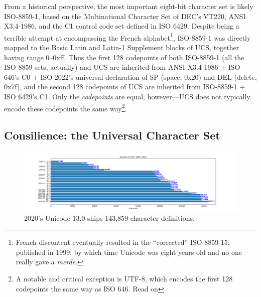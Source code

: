 From a historical perspective, the most important eight-bit character set
is likely ISO-8859-1\cite{iso8859}, based on the Multinational Character Set
of DEC's VT220, ANSI X3.4-1986, and the C1 control code set defined in ISO 6429.
Despite being a terrible attempt at encompassing the French alphabet\footnote{French
discontent eventually resulted in the ``corrected'' ISO-8859-15, published in
1999, by which time Unicode was eight years old and no one really gave a \textit{merde}\cite{french}.},
ISO-8859-1 was directly mapped to the Basic Latin and Latin-1 Supplement blocks
of UCS, together having range 0--0xff. Thus the first 128 codepoints of both 
ISO-8859-1 (all the ISO 8859 sets, actually) and UCS are inherited from ANSI
X3.4-1986 + ISO 646's C0 + ISO 2022's universal declaration of SP (space, 0x20) and
DEL (delete, 0x7f), and the second 128 codepoints of UCS are inherited
from ISO-8859-1 + ISO 6429's C1. Only the \textit{codepoints} are equal, however---UCS
does not typically encode these codepoints the same way\footnote{A notable
and critical exception is UTF-8, which encodes the first 128 codepoints the
same way as ISO 646. Read on\textellipsis}.

\subsection{Consilience: the Universal Character Set}
\label{sec:ucs}
\begin{figure}[!htb]
  \centering
  \includegraphics[width=1.1\linewidth]{media/unicode-growth.png}
  \caption{2020's Unicode 13.0 ships 143,859 character definitions.}
  \label{fig:unicodegrowth}
\end{figure}

